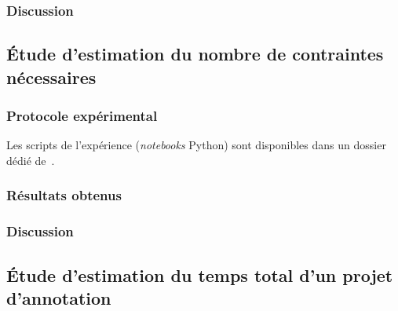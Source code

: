 		\subsubsection{Discussion}
		
	
	\subsection{Étude d'estimation du nombre de contraintes nécessaires}
	\label{section:4.3.3-ETUDE-COUT-NOMBRE-CONTRAINTES}
	
		\subsubsection{Protocole expérimental}


			\begin{leftBarInformation}
				Les scripts de l'expérience (\textit{notebooks} Python) sont disponibles dans un dossier dédié de~\cite{schild:cognitivefactory-interactive-clustering-comparative-study:2021}.
			\end{leftBarInformation}

		\subsubsection{Résultats obtenus}

		\subsubsection{Discussion}
	
	\subsection{Étude d'estimation du temps total d'un projet d'annotation}
	\label{section:4.3.4-ETUDE-COUTS-TOTAL}
	
